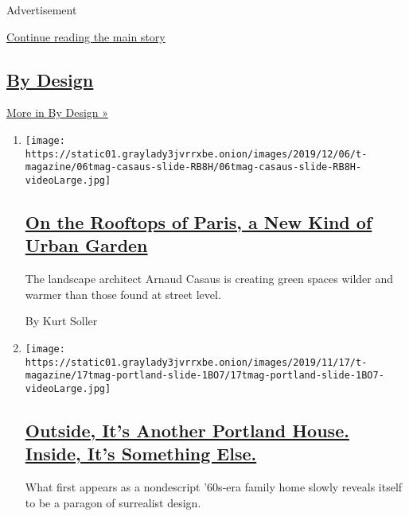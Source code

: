 Advertisement

\protect\hyperlink{after-mid1}{Continue reading the main story}

\hypertarget{by-design-1}{%
\subsection{\texorpdfstring{\href{/column/by-design}{By
Design}}{By Design}}\label{by-design-1}}

\href{/column/by-design}{More in By Design »}

\begin{enumerate}
\def\labelenumi{\arabic{enumi}.}
\item
  \texttt{[image: https://static01.graylady3jvrrxbe.onion/images/2019/12/06/t-magazine/06tmag-casaus-slide-RB8H/06tmag-casaus-slide-RB8H-videoLarge.jpg]}

  \hypertarget{on-the-rooftops-of-paris-a-new-kind-of-urban-garden}{%
  \subsection{\texorpdfstring{\href{/2019/12/06/t-magazine/paris-rooftop-garden.html}{On
  the Rooftops of Paris, a New Kind of Urban
  Garden}}{On the Rooftops of Paris, a New Kind of Urban Garden}}\label{on-the-rooftops-of-paris-a-new-kind-of-urban-garden}}

  The landscape architect Arnaud Casaus is creating green spaces wilder
  and warmer than those found at street level.

  By Kurt Soller
\item
  \texttt{[image: https://static01.graylady3jvrrxbe.onion/images/2019/11/17/t-magazine/17tmag-portland-slide-1BO7/17tmag-portland-slide-1BO7-videoLarge.jpg]}

  \hypertarget{outside-its-another-portland-house-inside-its-something-else}{%
  \subsection{\texorpdfstring{\href{/2019/11/05/t-magazine/portland-house-allie-furlotti-osmose-design.html}{Outside,
  It's Another Portland House. Inside, It's Something
  Else.}}{Outside, It's Another Portland House. Inside, It's Something Else.}}\label{outside-its-another-portland-house-inside-its-something-else}}

  What first appears as a nondescript '60s-era family home slowly
  reveals itself to be a paragon of surrealist design.


\end{enumerate}
